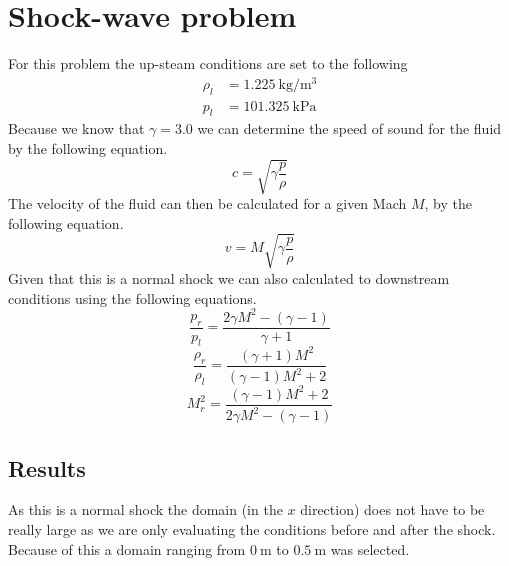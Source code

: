 \documentclass[paper=a4, fontsize=12pt]{scrartcl}
\begin{document}
\section{Shock-wave problem}
For this problem the up-steam conditions are set to the following
\begin{align*}
        \rho_l &= \SI{1.225}{\kilogram \per \meter^3}\\
        p_l &= \SI{101.325}{\kilo \pascal}
\end{align*}
Because we know that $\gamma = 3.0$ we can determine the speed of sound for the fluid by the following
equation.
\[
        c= \sqrt{\gamma \frac{p}{\rho}}
\]
The velocity of the fluid can then be calculated for a given Mach $M$, by the following equation.
\[
v = M \sqrt{\gamma \frac{p}{\rho}}
\]
Given that this is a normal shock we can also calculated to downstream conditions using the following
equations.
\[
        \frac{p_r}{p_l} = \frac{2 \gamma M^2 - (\gamma-1)}{\gamma+1}
\]
\[
        \frac{\rho_r}{\rho_l} = \frac{(\gamma+1)M^2}{(\gamma-1)M^2 +2}
\]
\[
        M_r^2= \frac{(\gamma -1)M^2 +2}{2\gamma M^2-(\gamma-1)}
\]
\subsection{Results}
As this is a normal shock the domain (in the $x$ direction) does not have to be really large as we are only
evaluating the conditions before and after the shock.
Because of this a domain ranging from $\SI{0}{\meter}$ to $\SI{0.5}{\meter}$ was selected.
\end{document}
